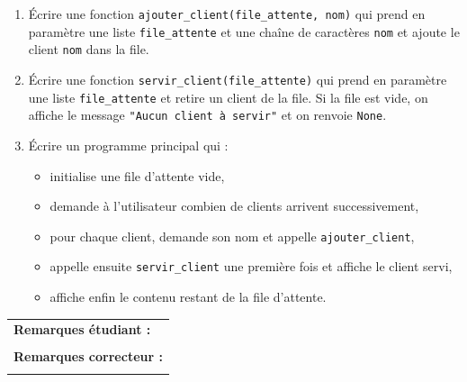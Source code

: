 \documentclass[a4paper,11pt]{article}
\begin{document}
\begin{enumerate}
  \item[1.] Écrire une fonction \texttt{ajouter\_client(file\_attente, nom)} qui prend en paramètre une liste \texttt{file\_attente} et une chaîne de caractères \texttt{nom} et  ajoute le client \texttt{nom} dans la file. 
  
   \item[2.] Écrire une fonction \texttt{servir\_client(file\_attente)} qui  prend en paramètre une liste \texttt{file\_attente} et retire un client de la file. Si la file est vide, on affiche le message \texttt{"Aucun client à servir"} et on renvoie \texttt{None}. 
 \item[3.] Écrire un programme principal qui : 
 
 \begin{itemize}
     \item initialise une file d’attente vide,
     \item demande à l’utilisateur combien de clients arrivent successivement,
     \item pour chaque client, demande son nom et appelle \texttt{ajouter\_client},
     \item appelle ensuite \texttt{servir\_client} une première fois et affiche le client servi,
     \item affiche enfin le contenu restant de la file d’attente.
 \end{itemize}

 \end{enumerate}


\begin{table}[h!]
\centering
\renewcommand{\arraystretch}{1.4}
\begin{tabular}{|p{15cm}|}
\hline
\textbf{Remarques étudiant :} \\
 \\
\hline
\textbf{Remarques correcteur :} \\
 \\
\hline
\end{tabular}
\end{table}
\end{document}

